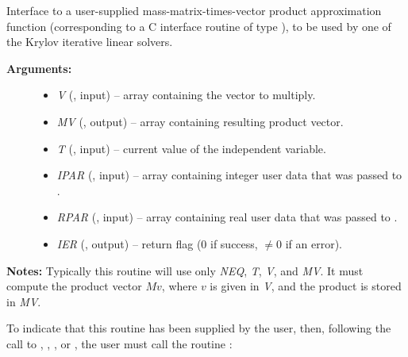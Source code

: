 \documentclass[letterpaper,10pt,english]{sphinxmanual}
\begin{document}
\begin{fulllineitems}
\label{f_interface/Usage:f/_/FARKMTIMES}
Interface to a user-supplied mass-matrix-times-vector product
approximation function (corresponding to a C interface routine of
type {\hyperref[c_interface/User_supplied:c.ARKSpilsMassTimesVecFn]{\emph{}}}), to be used by one of the
Krylov iterative linear solvers.
\begin{description}
\item[{\textbf{Arguments:}}] \leavevmode\begin{itemize}
\item {} 
\emph{V}    (, input) -- array containing the vector to multiply.

\item {} 
\emph{MV}   (, output) -- array containing resulting product vector.

\item {} 
\emph{T}    (, input) -- current value of the independent variable.

\item {} 
\emph{IPAR} (, input) -- array containing integer user data that was passed to
{\hyperref[f_interface/Usage:f/_/FARKMALLOC]{\emph{}}}.

\item {} 
\emph{RPAR} (, input) -- array containing real user data that was passed to
{\hyperref[f_interface/Usage:f/_/FARKMALLOC]{\emph{}}}.

\item {} 
\emph{IER}  (, output) -- return flag  (0 if success, \(\ne 0\) if an error).

\end{itemize}

\end{description}

\textbf{Notes:}
Typically this routine will use only \emph{NEQ}, \emph{T}, \emph{V}, and
\emph{MV}.  It must compute the product vector \(Mv\), where
\(v\) is given in \emph{V}, and the product is stored in \emph{MV}.

\end{fulllineitems}


To indicate that this routine has been supplied by the user, then,
following the call to {\hyperref[f_interface/Usage:f/_/FARKMASSSPGMR]{\emph{}}},
{\hyperref[f_interface/Usage:f/_/FARKMASSSPBCG]{\emph{}}}, {\hyperref[f_interface/Usage:f/_/FARKMASSSPTFQMR]{\emph{}}},
{\hyperref[f_interface/Usage:f/_/FARKMASSSPFGMR]{\emph{}}} or {\hyperref[f_interface/Usage:f/_/FARKMASSPCG]{\emph{}}}, the user must
call the routine {\hyperref[f_interface/Usage:f/_/FARKSPILSSETMASS]{\emph{}}}:
\end{document}
